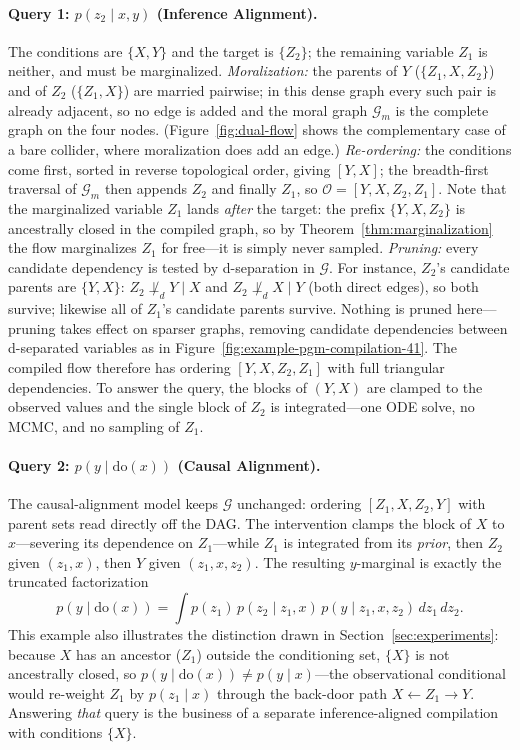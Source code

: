 \paragraph{Query 1: $p(z_2 \mid x, y)$ (Inference Alignment).}
The conditions are $\{X, Y\}$ and the target is $\{Z_2\}$; the remaining variable $Z_1$ is neither, and must be marginalized.
\emph{Moralization:} the parents of $Y$ ($\{Z_1, X, Z_2\}$) and of $Z_2$ ($\{Z_1, X\}$) are married pairwise; in this dense graph every such pair is already adjacent, so no edge is added and the moral graph $\mathcal{G}_m$ is the complete graph on the four nodes. (Figure~\ref{fig:dual-flow} shows the complementary case of a bare collider, where moralization does add an edge.)
\emph{Re-ordering:} the conditions come first, sorted in reverse topological order, giving $[Y, X]$; the breadth-first traversal of $\mathcal{G}_m$ then appends $Z_2$ and finally $Z_1$, so $\mathcal{O} = [Y, X, Z_2, Z_1]$. Note that the marginalized variable $Z_1$ lands \emph{after} the target: the prefix $\{Y, X, Z_2\}$ is ancestrally closed in the compiled graph, so by Theorem~\ref{thm:marginalization} the flow marginalizes $Z_1$ for free---it is simply never sampled.
\emph{Pruning:} every candidate dependency is tested by d-separation in $\mathcal{G}$. For instance, $Z_2$'s candidate parents are $\{Y, X\}$: $Z_2 \not\perp_d Y \mid X$ and $Z_2 \not\perp_d X \mid Y$ (both direct edges), so both survive; likewise all of $Z_1$'s candidate parents survive. Nothing is pruned here---pruning takes effect on sparser graphs, removing candidate dependencies between d-separated variables as in Figure~\ref{fig:example-pgm-compilation-41}.
The compiled flow therefore has ordering $[Y, X, Z_2, Z_1]$ with full triangular dependencies. To answer the query, the blocks of $(Y, X)$ are clamped to the observed values and the single block of $Z_2$ is integrated---one ODE solve, no MCMC, and no sampling of $Z_1$.

\paragraph{Query 2: $p(y \mid \mathrm{do}(x))$ (Causal Alignment).}
The causal-alignment model keeps $\mathcal{G}$ unchanged: ordering $[Z_1, X, Z_2, Y]$ with parent sets read directly off the DAG. The intervention clamps the block of $X$ to $x$---severing its dependence on $Z_1$---while $Z_1$ is integrated from its \emph{prior}, then $Z_2$ given $(z_1, x)$, then $Y$ given $(z_1, x, z_2)$. The resulting $y$-marginal is exactly the truncated factorization
\begin{equation}
    p(y \mid \mathrm{do}(x)) = \int p(z_1)\, p(z_2 \mid z_1, x)\, p(y \mid z_1, x, z_2)\, dz_1\, dz_2.
\end{equation}
This example also illustrates the distinction drawn in Section~\ref{sec:experiments}: because $X$ has an ancestor ($Z_1$) outside the conditioning set, $\{X\}$ is not ancestrally closed, so $p(y \mid \mathrm{do}(x)) \neq p(y \mid x)$---the observational conditional would re-weight $Z_1$ by $p(z_1 \mid x)$ through the back-door path $X \leftarrow Z_1 \to Y$. Answering \emph{that} query is the business of a separate inference-aligned compilation with conditions $\{X\}$.

